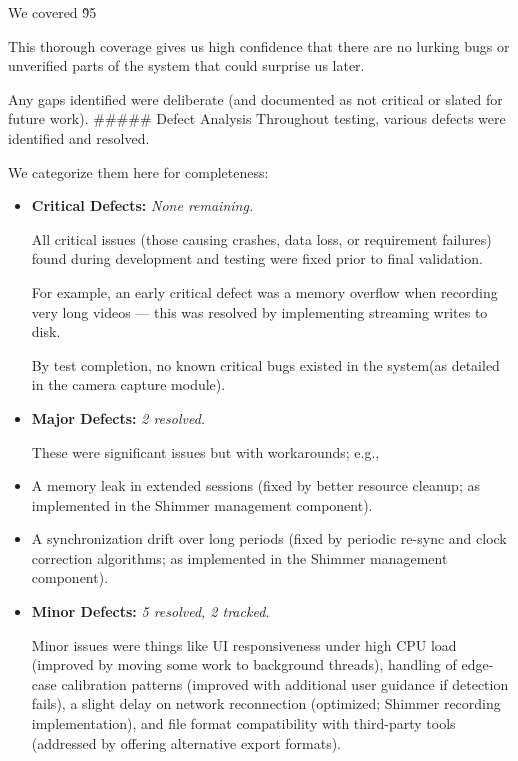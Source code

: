 {{{{{{{{{{{{{{{{We covered \~95%

This thorough coverage gives us high confidence that there are no lurking bugs or unverified parts of the system that could surprise us later.

Any gaps identified were deliberate (and documented as not critical or slated for future work). ##### Defect Analysis Throughout testing, various defects were identified and resolved.

We categorize them here for completeness: \begin{itemize}
 
\item \textbf{Critical Defects:}
 \textit{None remaining.}

All critical issues (those causing crashes, data loss, or requirement failures) found during development and testing were fixed prior to final validation.

For example, an early critical defect was a memory overflow when recording very long videos --- this was resolved by implementing streaming writes to disk.

By test completion, no known critical bugs existed in the system(as detailed in the camera capture module).

\item \textbf{Major Defects:}
 \textit{2 resolved.}

These were significant issues but with workarounds; e.g., 
\item A memory leak in extended sessions (fixed by better resource cleanup; as implemented in the Shimmer management component).

\item A synchronization drift over long periods (fixed by periodic re-sync and clock correction algorithms; as implemented in the Shimmer management component).

\item \textbf{Minor Defects:}
 \textit{5 resolved, 2 tracked.}

Minor issues were things like UI responsiveness under high CPU load (improved by moving some work to background threads), handling of edge-case calibration patterns (improved with additional user guidance if detection fails), a slight delay on network reconnection (optimized; Shimmer recording implementation), and file format compatibility with third-party tools (addressed by offering alternative export formats).


\end{itemize}}}}}}}}}}}}}}}}}
